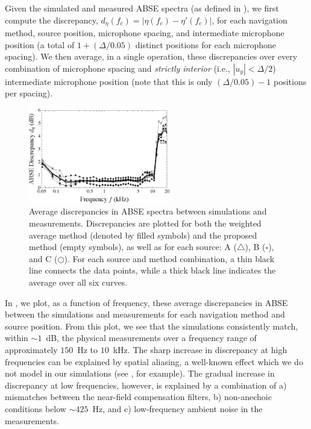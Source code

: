 Given the simulated and measured ABSE spectra (as defined in ), we first compute the discrepancy, $d_\eta(f_c) = |\eta(f_c) - \eta'(f_c)|$, for each navigation method, source position, microphone spacing, and intermediate microphone position (a total of $1 + (\Delta/0.05)$ distinct positions for each microphone spacing).
We then average, in a single operation, these discrepancies over every combination of microphone spacing and \textit{strictly interior} (i.e., $|u_y| < \Delta/2$) intermediate microphone position (note that this is only $(\Delta/0.05) - 1$ positions per spacing).

\begin{figure}[t]
\centering
  \includegraphics[width = 0.55\textwidth]{10_experimental_validation/figures/scharer2009_fullexp_F.eps}
  \caption[Experimental discrepancies in coloration spectra.]{
  Average discrepancies in ABSE spectra between simulations and measurements.
  Discrepancies are plotted for both the weighted average method (denoted by filled symbols) and the proposed method (empty symbols),
  as well as for each source: A ($\triangle$), B ($\square$), and C ($\bigcirc$).
  For each source and method combination, a thin black line connects the data points, while a thick black line indicates the average over all six curves.}
  \label{fig:10_Experimental_Validation:ABSE_Freq_Discrepancy}
\end{figure}

In , we plot, as a function of frequency, these average discrepancies in ABSE between the simulations and measurements for each navigation method and source position.
From this plot, we see that the simulations consistently match, within $\sim1$~dB, the physical measurements over a frequency range of approximately $150$~Hz to $10$~kHz.
The sharp increase in discrepancy at high frequencies can be explained by spatial aliasing,
a well-known effect which we do not model in our simulations (see \citet{Rafaely2005a}, for example).
The gradual increase in discrepancy at low frequencies, however, is explained by a combination of a) mismatches between the near-field compensation filters, b) non-anechoic conditions below $\sim425$~Hz, and c) low-frequency ambient noise in the measurements.

